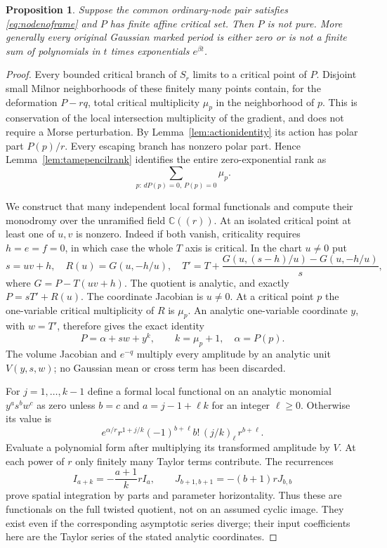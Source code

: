 \documentclass[11pt]{article}
\newtheorem{proposition}[theorem]{Proposition}
\theoremstyle{definition}\newtheorem{definition}[theorem]{Definition}
\theoremstyle{remark}\newtheorem{remark}[theorem]{Remark}
\newcommand{\C}{\mathbb C}
\begin{document}
\begin{proposition}\label{prop:ordinaryfinite}
Suppose the common ordinary-node pair satisfies
\eqref{eq:nodenoframe} and $P$ has finite affine critical set.
Then $P$ is not pure. More generally every original Gaussian
marked period is either zero or is not a finite sum of
polynomials in $t$ times exponentials $e^{\beta t}$.
\end{proposition}
\begin{proof}
Every bounded critical branch of $S_r$ limits to a critical point
of $P$. Disjoint small Milnor neighborhoods of these finitely many
points contain, for the deformation $P-rq$, total critical
multiplicity $\mu_p$ in the neighborhood of $p$. This is
conservation of the local intersection multiplicity of the
gradient, and does not require a Morse perturbation. By
Lemma~\ref{lem:actionidentity} its action has polar part
$P(p)/r$. Every escaping branch has nonzero polar part. Hence
Lemma~\ref{lem:tamepencilrank} identifies the entire zero-exponential
rank as
\begin{equation}\label{eq:ordinaryzerorank}
 \sum_{p:\,dP(p)=0,\,P(p)=0}\mu_p.
\end{equation}

We construct that many independent local formal functionals and
compute their monodromy over the unramified field $\C((r))$.
At an isolated critical point at least one of $u,v$ is nonzero.
Indeed if both vanish, criticality requires $h=e=f=0$, in which
case the whole $T$ axis is critical. In the chart $u\ne0$ put
\[
 s=uv+h,\quad R(u)=G(u,-h/u),\quad
 T'=T+\frac{G(u,(s-h)/u)-G(u,-h/u)}s,
\]
where $G=P-T(uv+h)$. The quotient is analytic, and exactly
$P=sT'+R(u)$. The coordinate Jacobian is $u\ne0$. At a critical
point $p$ the one-variable critical multiplicity of $R$ is
$\mu_p$. An analytic one-variable coordinate $y$, with
$w=T'$, therefore gives the exact identity
\[
 P=\alpha+sw+y^k,\qquad k=\mu_p+1,\quad\alpha=P(p).
\]
The volume Jacobian and $e^{-q}$ multiply every amplitude by an
analytic unit $V(y,s,w)$; no Gaussian mean or cross term has been
discarded.

For $j=1,\ldots,k-1$ define a formal local functional on an
analytic monomial $y^a s^b w^c$ as zero unless $b=c$ and
$a=j-1+\ell k$ for an integer $\ell\ge0$. Otherwise its value is
\begin{equation}\label{eq:ordinarycharacters}
 e^{\alpha/r}r^{1+j/k}
       (-1)^{b+\ell}b!\,(j/k)_\ell\,r^{b+\ell}.
\end{equation}
Evaluate a polynomial form after multiplying its transformed
amplitude by $V$. At each power of $r$ only finitely many Taylor
terms contribute. The recurrences
\[
 I_{a+k}=-\frac{a+1}{k}r I_a,\qquad
 J_{b+1,b+1}=-(b+1)rJ_{b,b}
\]
prove spatial integration by parts and parameter horizontality.
Thus these are functionals on the full twisted quotient, not on
an assumed cyclic image. They exist even if the corresponding
asymptotic series diverge; their input coefficients here are the
Taylor series of the stated analytic coordinates.


\end{proof}
\end{document}
